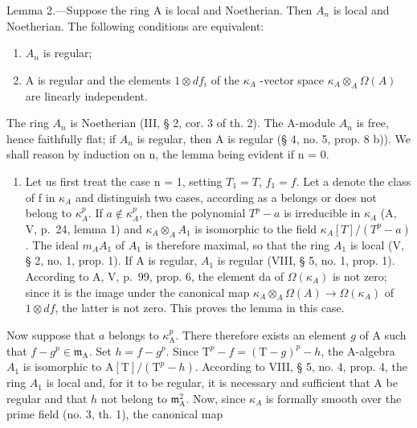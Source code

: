 Lemma 2.—Suppose the ring A is local and Noetherian. Then \(A_{n}\) is local and Noetherian. The following conditions are equivalent:

\begin{enumerate}
\def\labelenumi{(\roman{enumi})}
\item
  \(A_{n}\) is regular;
\item
  A is regular and the elements \(1 \otimes df_{i}\) of the \(\kappa_{A}\) -vector space \(\kappa_{A} \otimes_{A} \Omega(A)\) are linearly independent.
\end{enumerate}

The ring \(A_{n}\) is Noetherian (III, § 2, cor. 3 of th. 2). The A-module \(A_{n}\) is free, hence faithfully flat; if \(A_{n}\) is regular, then A is regular (§ 4, no. 5, prop. 8 b)). We shall reason by induction on n, the lemma being evident if n = 0.

\begin{enumerate}
\def\labelenumi{\Alph{enumi})}
\tightlist
\item
  Let us first treat the case n = 1, setting \(T_{1} = T\), \(f_{1} = f\). Let a denote the class of f in \(\kappa_{A}\) and distinguish two cases, according as a belongs or does not belong to \(\kappa_{A}^{p}\). If \(a \notin \kappa_{A}^{p}\), then the polynomial \(T^{p} - a\) is irreducible in \(\kappa_{A}\) (A, V, p.~24, lemma 1) and \(\kappa_{A} \otimes_{A} A_{1}\) is isomorphic to the field \(\kappa_{A}[T]/(T^{p} - a)\). The ideal \(m_{A}A_{1}\) of \(A_{1}\) is therefore maximal, so that the ring \(A_{1}\) is local (V, § 2, no. 1, prop. 1). If A is regular, \(A_{1}\) is regular (VIII, § 5, no. 1, prop. 1). According to A, V, p.~99, prop. 6, the element da of \(\Omega(\kappa_{A})\) is not zero; since it is the image under the canonical map \(\kappa_{A} \otimes_{A} \Omega(A) \to \Omega(\kappa_{A})\) of \(1 \otimes df\), the latter is not zero. This proves the lemma in this case.
\end{enumerate}

Now suppose that \(a\) belongs to \(\kappa_{\mathrm{A}}^{p}\). There therefore exists an element \(g\) of A such that \(f - g^{p} \in \mathfrak{m}_{\mathrm{A}}\). Set \(h = f - g^{p}\). Since \(\mathrm{T}^{p} - f = (\mathrm{T} - g)^{p} - h\), the A-algebra \(A_{1}\) is isomorphic to \(\mathrm{A}[\mathrm{T}] / (\mathrm{T}^{p} - h)\). According to VIII, § 5, no. 4, prop. 4, the ring \(A_{1}\) is local and, for it to be regular, it is necessary and sufficient that A be regular and that \(h\) not belong to \(\mathfrak{m}_{\mathrm{A}}^{2}\). Now, since \(\kappa_{A}\) is formally smooth over the prime field (no. 3, th. 1), the canonical map

